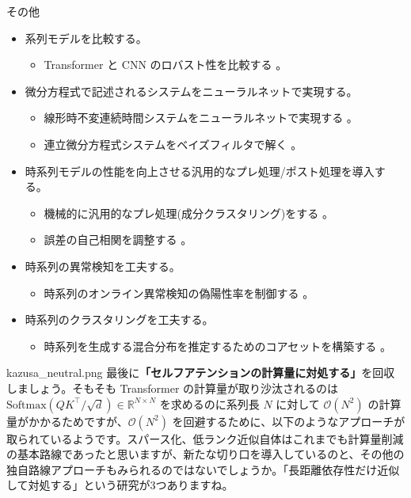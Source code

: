 \documentclass[b5paper,xelatex,ja=standard,10pt]{bxjsarticle}
\begin{document}
\vspace{1pt}
\begin{PROP}[left=0pt]{その他}
\begin{itemize}
  \item 系列モデルを比較する。
  \begin{itemize}
    \item Transformer と CNN のロバスト性を比較する \cite{YutongBai2021}。
  \end{itemize}
  \vspace{6pt}
  \item 微分方程式で記述されるシステムをニューラルネットで実現する。
  \begin{itemize}
    \item 線形時不変連続時間システムをニューラルネットで実現する \cite{AlbertGu2021}。
    \item 連立微分方程式システムをベイズフィルタで解く \cite{JonathanSchmidt2021}。
  \end{itemize}
  \vspace{6pt}
  \item 時系列モデルの性能を向上させる汎用的なプレ処理/ポスト処理を導入する。
  \begin{itemize}
    \item 機械的に汎用的なプレ処理(成分クラスタリング)をする \cite{ZhiboZhu2021}。
    \item 誤差の自己相関を調整する \cite{FanKengSun2021}。
  \end{itemize}
  \vspace{6pt}
  \item 時系列の異常検知を工夫する。
  \begin{itemize}
    \item 時系列のオンライン異常検知の偽陽性率を制御する \cite{QuentinRebjock2021}。
  \end{itemize}
  \vspace{6pt}
  \item 時系列のクラスタリングを工夫する。
  \begin{itemize}
    \item 時系列を生成する混合分布を推定するためのコアセットを構築する \cite{LingxiaoHuang2021}。
  \end{itemize}
\end{itemize}
\end{PROP}
\vspace{1pt}

\begin{SERIFU}[colback=PaleIris, colbacktitle=PaleIris2]{kazusa_neutral.png}
最後に\textbf{「セルフアテンションの計算量に対処する」}を回収しましょう。そもそも Transformer の計算量が取り沙汰されるのは $\mathrm{Softmax} \left( Q K ^\top / \sqrt{d} \right) \in \mathbb{R}^{N \times N}$ を求めるのに系列長 $N$ に対して $\mathcal{O}(N^2)$ の計算量がかかるためですが、$\mathcal{O}(N^2)$ を回避するために、以下のようなアプローチが取られているようです。スパース化、低ランク近似自体はこれまでも計算量削減の基本路線であったと思いますが、新たな切り口を導入しているのと、その他の独自路線アプローチもみられるのではないでしょうか。「長距離依存性だけ近似して対処する」という研究が3つありますね。
\end{SERIFU}
\end{document}
